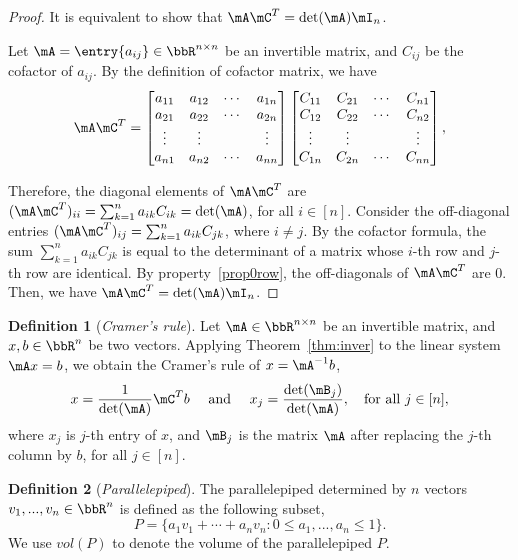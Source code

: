 \documentclass[11pt]{article}
\theoremstyle{plain}
\theoremstyle{definition}
\newtheorem{defn}{Definition}
\begin{document}
\begin{proof}
	It is equivalent to  show that $\mA \mC^T = \det(\mA) \mI_n$. 
	
	Let $\mA = \entry{a_{ij}} \in \bbR^{n \times n}$ be an invertible matrix, and $C_{ij}$ be the cofactor of $a_{ij}$. By the definition of cofactor matrix, we have
	\begin{align}
		\mA  \mC^T = \begin{bmatrix}
			a_{11} & a_{12} &\cdots &a_{1n}\\
			a_{21} & a_{22} &\cdots &a_{2n}\\
			\vdots & \vdots & & \vdots\\
			a_{n1} & a_{n2} &\cdots &a_{nn}\\
		\end{bmatrix} \begin{bmatrix}
			C_{11} & C_{21} &\cdots &C_{n1}\\
			C_{12} & C_{22} &\cdots &C_{n2}\\
			\vdots & \vdots & & \vdots\\
			C_{1n} & C_{2n} &\cdots &C_{nn}\\
		\end{bmatrix},
	\end{align}
	
	Therefore, the diagonal elements of $\mA \mC^T$ are $(\mA \mC^T)_{ii} = \sum_{k=1}^n a_{ik} C_{ik} = \det(\mA)$, for all $ i \in [n]$. Consider the off-diagonal entries $(\mA \mC^T)_{ij} = \sum_{k =1}^n a_{ik} C_{jk}$, where $i \neq j$. By the cofactor formula, the sum   $ \sum_{k =1}^n a_{ik} C_{jk}$ is equal to the determinant of a matrix whose $i$-th row and $j$-th row are identical. By property~\ref{prop0row}, the off-diagonals of $\mA \mC^T$ are 0. Then, we have $\mA \mC^T = \det(\mA) \mI_n$.
\end{proof}

\begin{defn}[\textit{Cramer's rule}]
Let  $\mA\in\bbR^{n \times n}$  be  an invertible matrix, and $ x, b \in \bbR^n$ be two vectors. Applying Theorem~\ref{thm:inver} to the linear system $\mA x=b$, we obtain the Cramer's rule of $x = \mA^{-1} b$, 
\[  x = \frac{1}{\det(\mA)} \mC^T b\quad \text{ and } \quad x_j = \frac{\det(\mB_j)}{\det(\mA)}, \quad \text{for all }j \in [n], \] 
	where $x_j$ is $j$-th entry of $x$, and $\mB_j$ is the matrix $\mA$ after replacing the $j$-th column by $b$,  for all $j \in [n]$.
\end{defn}

\begin{defn}[\textit{Parallelepiped}]
	The parallelepiped determined by $n$ vectors $v_1,...,v_n \in \bbR^n$ is defined as the following subset,
	\[ P = \{ a_1 v_1 + \cdots + a_n v_n \colon 0 \leq a_1,...,a_n \leq 1 \}. \]
	 We use $vol(P)$ to denote the volume of the parallelepiped  $P$. 
\end{defn}
\end{document}
